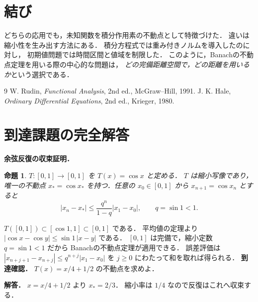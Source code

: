 \documentclass[a5paper,10pt,onecolumn]{jsarticle}
\makeatletter
\theoremstyle{mathnotetheorem}
\newtheorem{proposition}[theorem]{命題}
\renewcommand{\proofname}{証明}
\renewenvironment{proof}[1][\proofname]{%
  \par\pushQED{\qed}\normalfont\topsep4\p@\@plus2\p@\relax
  \trivlist\item[\hskip\labelsep\bfseries #1]\ignorespaces
}{\popQED\endtrivlist\@endpefalse}
\makeatother
\begin{document}
\section{結び}

どちらの応用でも，未知関数を積分作用素の不動点として特徴づけた．
違いは縮小性を生み出す方法にある．
積分方程式では重み付きノルムを導入したのに対し，
初期値問題では時間区間と値域を制限した．
このように，Banachの不動点定理を用いる際の中心的な問題は，
\emph{どの完備距離空間で，どの距離を用いるか}という選択である．

\begin{thebibliography}{9}
W. Rudin, \textit{Functional Analysis}, 2nd ed., McGraw--Hill, 1991.
J. K. Hale, \textit{Ordinary Differential Equations}, 2nd ed., Krieger, 1980.
\end{thebibliography}

\section{到達課題の完全解答}
\noindent\textbf{余弦反復の収束証明．}
\begin{proposition}
$T:[0,1]\to[0,1]$ を $T(x)=\cos x$ と定める．
$T$ は縮小写像であり，唯一の不動点
$x_*=\cos x_*$ を持つ．任意の $x_0\in[0,1]$ から
$x_{n+1}=\cos x_n$ とすると
\[
|x_n-x_*|\le
\frac{q^n}{1-q}|x_1-x_0|,
\qquad q=\sin1<1.
\]
\end{proposition}
\begin{proof}
$T([0,1])\subset[\cos1,1]\subset[0,1]$ である．
平均値の定理より
$|\cos x-\cos y|\le\sin1\,|x-y|$ である．
$[0,1]$ は完備で，縮小定数 $q=\sin1<1$ だから
Banachの不動点定理が適用できる．
誤差評価は
$|x_{n+j+1}-x_{n+j}|
\le q^{n+j}|x_1-x_0|$ を
$j\ge0$ にわたって和を取れば得られる．
\end{proof}
\noindent\textbf{到達確認．}
$T(x)=x/4+1/2$ の不動点を求めよ．
\par\noindent\textbf{解答．}
$x=x/4+1/2$ より $x_*=2/3$．
縮小率は $1/4$ なので反復はこれへ収束する．
\end{document}
